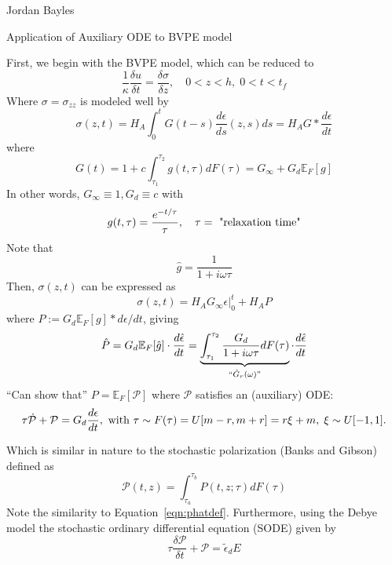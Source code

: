 \documentclass[12pt,letterpaper]{article}
\author{}
\date{}
\title{}
\newcommand{\field}[1]{\mathbb{#1}} %
\begin{document}
\begin{flushright}
Jordan Bayles
\end{flushright}

\begin{center}
Application of Auxiliary ODE to BVPE model
\end{center}

First, we begin with the BVPE model, which can be reduced to
\begin{equation}
\frac{1}{\kappa} \frac{\delta u}{\delta t} = \frac{\delta \sigma}{\delta z}, \quad 0 < z < h, \; 0 < t < t_f
\end{equation}
Where $\sigma = \sigma_{zz}$ is modeled well by
\begin{equation}
\sigma (z, t) = H_A \int_0^t G(t-s) \frac{d\epsilon}{ds} (z,s) ds = H_A G * \frac{d\epsilon}{dt} 
\end{equation}
where
\begin{equation}
G(t) = 1 + c \int_{\tau_1}^{\tau_2} g(t, \tau) dF( \tau ) = G_{\infty} + G_d \field{E}_F [g] 
\end{equation}
In other words, $G_{\infty} \equiv 1, G_d \equiv c$ with
\begin{equation}
g (t, \tau) = \frac{ e^{-t/\tau}}{\tau}, \quad \tau = \textnormal{ "relaxation time"}
\end{equation}
Note that
\begin{equation}
\hat{g} = \frac{1}{ 1 + i\omega\tau} 
\end{equation}
Then, $\sigma(z,t)$ can be expressed as
\begin{equation}
\sigma(z, t) = H_A G_{\infty} \left. \epsilon \right|_0^t + H_A P 
\end{equation}
where $P := G_d \field{E}_F [g] * d\epsilon/dt$, giving
\begin{equation}
\hat{P} = G_d \field{E}_F [ \hat{g} ] \cdot \frac{d\hat{\epsilon}}{dt} = \underbrace{\int_{\tau_1}^{\tau_2} \frac{G_d}{1 + i\omega\tau} d F(\tau)}_{``\hat{G}_r(\omega)"} \cdot \frac{d\hat{\epsilon}}{dt} 
\label{eqn:phatdef}
\end{equation}
``Can show that'' $P = \field{E}_F [ \mathcal{P} ]$ where $\mathcal{P}$ satisfies an (auxiliary) ODE:
\begin{equation}
\tau \dot{\mathcal{P}} + \mathcal{P} = G_d \frac{d\epsilon}{dt},\textnormal{ with } \tau \sim F(\tau) = U[m-r, m+r] = r\xi + m, \; \xi \sim U[-1,1].
\label{eqn:spdef} 
\end{equation}

 Which is similar in nature to the stochastic polarization (Banks and Gibson) defined as
\begin{equation}
\mathcal{P}(t,z) = \int_{\tau_a}^{\tau_b} P(t,z; \tau) d F(\tau)
\label{eqn:stopol}
\end{equation}
Note the similarity to Equation~\ref{eqn:phatdef}. Furthermore, using the Debye model the stochastic ordinary differential equation (SODE) given by
\begin{equation}
\tau \frac{\delta \mathcal{P}}{\delta t} + \mathcal{P} = \tilde{\epsilon}_d E
\label{eqn:sode}
\end{equation}
\end{document}
